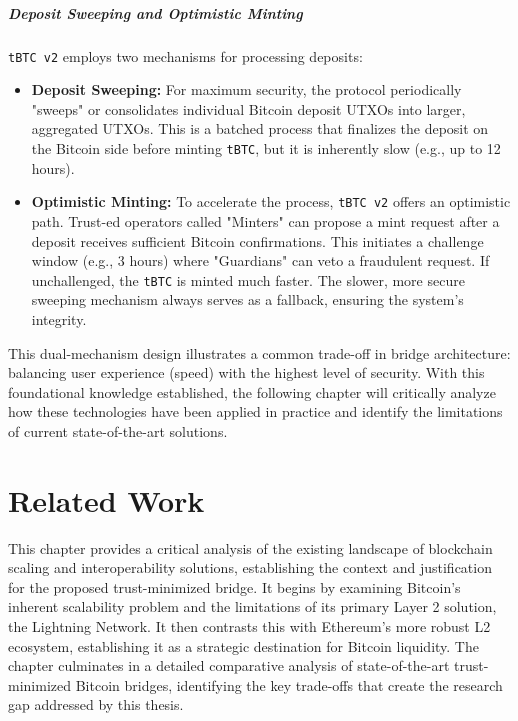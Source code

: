 \documentclass{DESSThesis}
\begin{document}
\paragraph{Deposit Sweeping and Optimistic Minting}
\texttt{tBTC v2} employs two mechanisms for processing deposits:
\begin{itemize}
    \item \textbf{Deposit Sweeping:} For maximum security, the protocol periodically "sweeps" or consolidates individual Bitcoin deposit UTXOs into larger, aggregated UTXOs. This is a batched process that finalizes the deposit on the Bitcoin side before minting \texttt{tBTC}, but it is inherently slow (e.g., up to 12 hours).
    \item \textbf{Optimistic Minting:} To accelerate the process, \texttt{tBTC v2} offers an optimistic path. Trust-ed operators called "Minters" can propose a mint request after a deposit receives sufficient Bitcoin confirmations. This initiates a challenge window (e.g., 3 hours) where "Guardians" can veto a fraudulent request. If unchallenged, the \texttt{tBTC} is minted much faster. The slower, more secure sweeping mechanism always serves as a fallback, ensuring the system's integrity.
\end{itemize}
This dual-mechanism design illustrates a common trade-off in bridge architecture: balancing user experience (speed) with the highest level of security. With this foundational knowledge established, the following chapter will critically analyze how these technologies have been applied in practice and identify the limitations of current state-of-the-art solutions.



\chapter{Related Work} \label{chap:related_work}
\thispagestyle{empty}

This chapter provides a critical analysis of the existing landscape of blockchain scaling and interoperability solutions, establishing the context and justification for the proposed trust-minimized bridge. It begins by examining Bitcoin's inherent scalability problem and the limitations of its primary Layer 2 solution, the Lightning Network. It then contrasts this with Ethereum's more robust L2 ecosystem, establishing it as a strategic destination for Bitcoin liquidity. The chapter culminates in a detailed comparative analysis of state-of-the-art trust-minimized Bitcoin bridges, identifying the key trade-offs that create the research gap addressed by this thesis.
\end{document}

